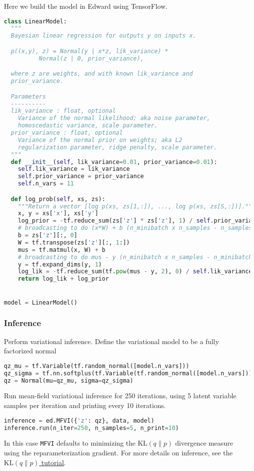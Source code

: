 Here we build the model in Edward using TensorFlow.
\begin{lstlisting}[language=Python]
class LinearModel:
  """
  Bayesian linear regression for outputs y on inputs x.

  p((x,y), z) = Normal(y | x*z, lik_variance) *
          Normal(z | 0, prior_variance),

  where z are weights, and with known lik_variance and
  prior_variance.

  Parameters
  ----------
  lik_variance : float, optional
    Variance of the normal likelihood; aka noise parameter,
    homoscedastic variance, scale parameter.
  prior_variance : float, optional
    Variance of the normal prior on weights; aka L2
    regularization parameter, ridge penalty, scale parameter.
  """
  def __init__(self, lik_variance=0.01, prior_variance=0.01):
    self.lik_variance = lik_variance
    self.prior_variance = prior_variance
    self.n_vars = 11

  def log_prob(self, xs, zs):
    """Return a vector [log p(xs, zs[1,:]), ..., log p(xs, zs[S,:])]."""
    x, y = xs['x'], xs['y']
    log_prior = -tf.reduce_sum(zs['z'] * zs['z'], 1) / self.prior_variance
    # broadcasting to do (x*W) + b (n_minibatch x n_samples - n_samples)
    b = zs['z'][:, 0]
    W = tf.transpose(zs['z'][:, 1:])
    mus = tf.matmul(x, W) + b
    # broadcasting to do mus - y (n_minibatch x n_samples - n_minibatch x 1)
    y = tf.expand_dims(y, 1)
    log_lik = -tf.reduce_sum(tf.pow(mus - y, 2), 0) / self.lik_variance
    return log_lik + log_prior


model = LinearModel()
\end{lstlisting}


\subsubsection{Inference}

Perform variational inference.
Define the variational model to be a fully factorized normal
\begin{lstlisting}[language=Python]
qz_mu = tf.Variable(tf.random_normal([model.n_vars]))
qz_sigma = tf.nn.softplus(tf.Variable(tf.random_normal([model.n_vars])))
qz = Normal(mu=qz_mu, sigma=qz_sigma)
\end{lstlisting}

Run mean-field variational inference for 250 iterations, using 5
latent variable samples per iteration and printing
every 10 iterations.
\begin{lstlisting}[language=Python]
inference = ed.MFVI({'z': qz}, data, model)
inference.run(n_iter=250, n_samples=5, n_print=10)
\end{lstlisting}
In this case \texttt{MFVI} defaults to minimizing the
$\text{KL}(q\|p)$ divergence measure using the reparameterization
gradient.
For more details on inference, see the \href{tut_KLqp.html}{$\text{KL}(q\|p)$ tutorial}.


